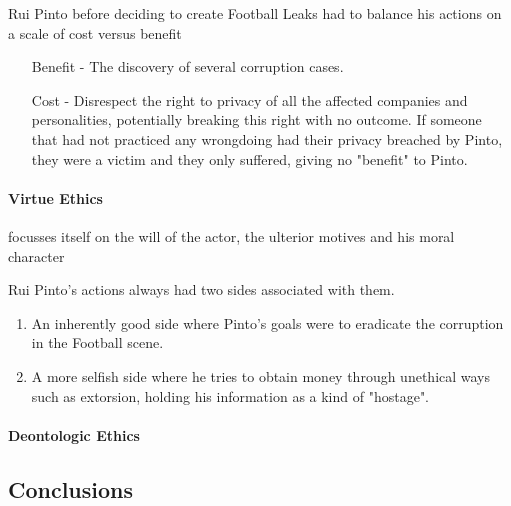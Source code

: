     Rui Pinto before deciding to create Football Leaks had to balance his actions on a scale of cost versus benefit
    \begin{enumerate}
        \item [Benefit] - The discovery of several corruption cases.
        \item [Cost] - Disrespect the right to privacy of all the affected companies and personalities, potentially breaking this right with no outcome.
        If someone that had not practiced any wrongdoing had their privacy breached by Pinto, they were a victim and they only suffered, giving no "benefit" to Pinto.
    \end{enumerate}

\paragraph{Virtue Ethics}
    focusses itself on the will of the actor, the ulterior motives and his moral character 
    
    Rui Pinto's actions always had two sides associated with them.
    \begin{enumerate}
        \item An inherently good side where Pinto's goals were to eradicate the corruption in the Football scene.
        \item A more selfish side where he tries to obtain money through unethical ways such as extorsion, holding his information as a kind of "hostage".
    \end{enumerate}

\paragraph{Deontologic Ethics}

\subsection{Conclusions}



    
